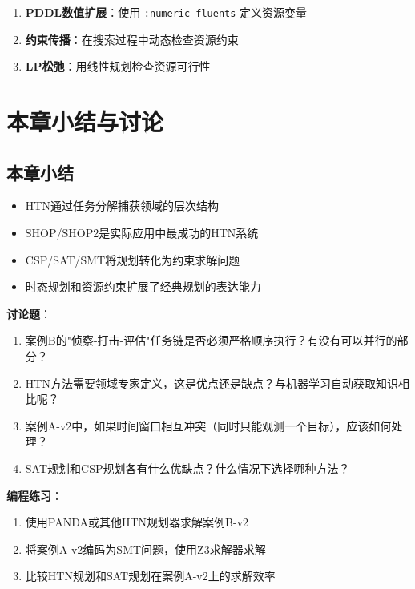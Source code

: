 \begin{keypoint}[资源约束的处理方法]
\begin{enumerate}
  \item \textbf{PDDL数值扩展}：使用 \texttt{:numeric-fluents} 定义资源变量
  \item \textbf{约束传播}：在搜索过程中动态检查资源约束
  \item \textbf{LP松弛}：用线性规划检查资源可行性
\end{enumerate}
\end{keypoint}

\section{本章小结与讨论}

\subsection*{本章小结}

\begin{itemize}[leftmargin=2em]
  \item HTN通过任务分解捕获领域的层次结构
  \item SHOP/SHOP2是实际应用中最成功的HTN系统
  \item CSP/SAT/SMT将规划转化为约束求解问题
  \item 时态规划和资源约束扩展了经典规划的表达能力
\end{itemize}

\begin{discussbox}
\textbf{讨论题}：
\begin{enumerate}
  \item 案例B的"侦察-打击-评估"任务链是否必须严格顺序执行？有没有可以并行的部分？
  \item HTN方法需要领域专家定义，这是优点还是缺点？与机器学习自动获取知识相比呢？
  \item 案例A-v2中，如果时间窗口相互冲突（同时只能观测一个目标），应该如何处理？
  \item SAT规划和CSP规划各有什么优缺点？什么情况下选择哪种方法？
\end{enumerate}

\textbf{编程练习}：
\begin{enumerate}
  \item 使用PANDA或其他HTN规划器求解案例B-v2
  \item 将案例A-v2编码为SMT问题，使用Z3求解器求解
  \item 比较HTN规划和SAT规划在案例A-v2上的求解效率
\end{enumerate}
\end{discussbox}
